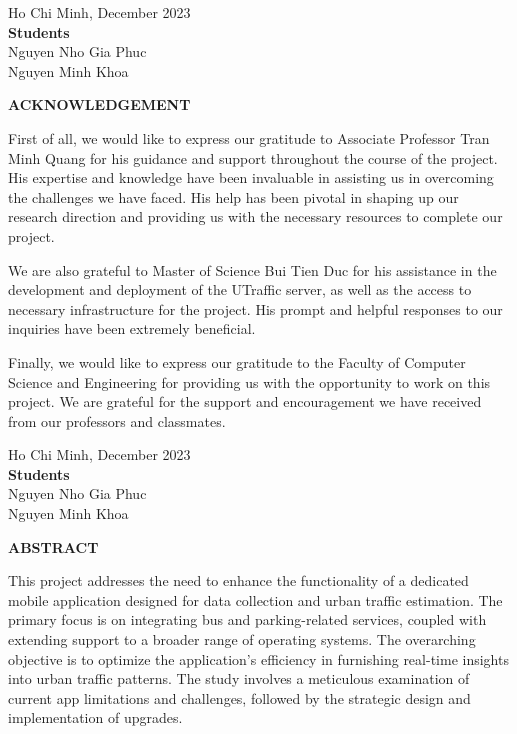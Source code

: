 \documentclass[a4paper]{article}
\begin{document}
\begin{flushright}
    Ho Chi Minh, December 2023 \\
    \textbf{Students} \\
    Nguyen Nho Gia Phuc \\
    Nguyen Minh Khoa
\end{flushright}


\newpage
\begin{center}
    \Large{\textbf{ACKNOWLEDGEMENT}}
\end{center}

First of all, we would like to express our gratitude to Associate Professor Tran Minh Quang for his guidance and support throughout the course of the project. His expertise and knowledge have been invaluable in assisting us in overcoming the challenges we have faced. His help has been pivotal in shaping up our research direction and providing us with the necessary resources to complete our project. 

We are also grateful to Master of Science Bui Tien Duc for his assistance in the development and deployment of the UTraffic server, as well as the access to necessary infrastructure for the project. His prompt and helpful responses to our inquiries have been extremely beneficial.

Finally, we would like to express our gratitude to the Faculty of Computer Science and Engineering for providing us with the opportunity to work on this project. We are grateful for the support and encouragement we have received from our professors and classmates.

\begin{flushright}
    Ho Chi Minh, December 2023 \\
    \textbf{Students} \\
    Nguyen Nho Gia Phuc \\
    Nguyen Minh Khoa
\end{flushright}

\newpage
\begin{center}
    \Large{\textbf{ABSTRACT}}
\end{center}

This project addresses the need to enhance the functionality of a dedicated mobile application designed for data collection and urban traffic estimation. The primary focus is on integrating bus and parking-related services, coupled with extending support to a broader range of operating systems. The overarching objective is to optimize the application's efficiency in furnishing real-time insights into urban traffic patterns. The study involves a meticulous examination of current app limitations and challenges, followed by the strategic design and implementation of upgrades.
\end{document}
